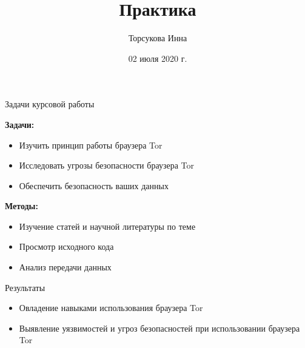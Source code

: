 \documentclass{beamer}
\begin{document}
\title {Практика}

\author {Торсукова Инна}


\date{02 июля 2020 г.}

\begin{frame}

\titlepage

\end{frame}



\begin{frame}{Задачи курсовой работы}

\textbf{Задачи:}

\begin{itemize}

\item Изучить принцип работы браузера Tor

\item Исследовать угрозы безопасности браузера Tor

\item Обеспечить безопасность ваших данных

\end{itemize}

\textbf{Методы:}

\begin{itemize}

\item Изучение статей и научной литературы по теме

\item Просмотр исходного кода

\item Анализ передачи данных 



\end{itemize}

\end{frame}



\begin{frame}{Результаты}

\begin{itemize}

\item Овладение навыками использования браузера Tor

\item Выявление уязвимостей и угроз безопасностей при использовании браузера Tor

\end{itemize}

\end{frame}
\end{document}
